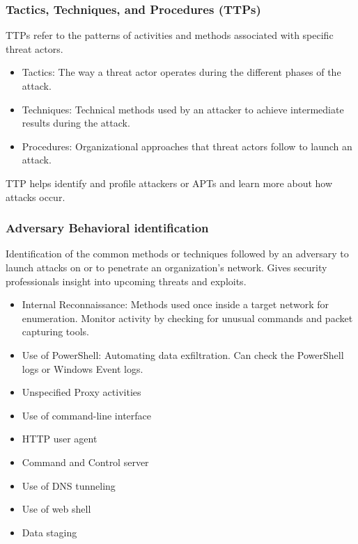 \subsubsection{Tactics, Techniques, and Procedures (TTPs)}
TTPs refer to the patterns of activities and methods associated with specific threat actors.
\begin{itemize}
    \item Tactics: The way a threat actor operates during the different phases of the attack.
    \item Techniques: Technical methods used by an attacker to achieve intermediate results during the attack.
    \item Procedures: Organizational approaches that threat actors follow to launch an attack.
\end{itemize}
TTP helps identify and profile attackers or APTs and learn more about how attacks occur.

\subsubsection{Adversary Behavioral identification}
Identification of the common methods or techniques followed by an adversary to launch attacks on or to penetrate an organization's network.
Gives security professionals insight into upcoming threats and exploits.
\begin{itemize}
    \item Internal Reconnaissance: Methods used once inside a target network for enumeration.
    Monitor activity by checking for unusual commands and packet capturing tools.
    \item Use of PowerShell: Automating data exfiltration.
    Can check the PowerShell logs or Windows Event logs.
    \item Unspecified Proxy activities
    \item Use of command-line interface
    \item HTTP user agent
    \item Command and Control server
    \item Use of DNS tunneling
    \item Use of web shell
    \item Data staging
\end{itemize}

